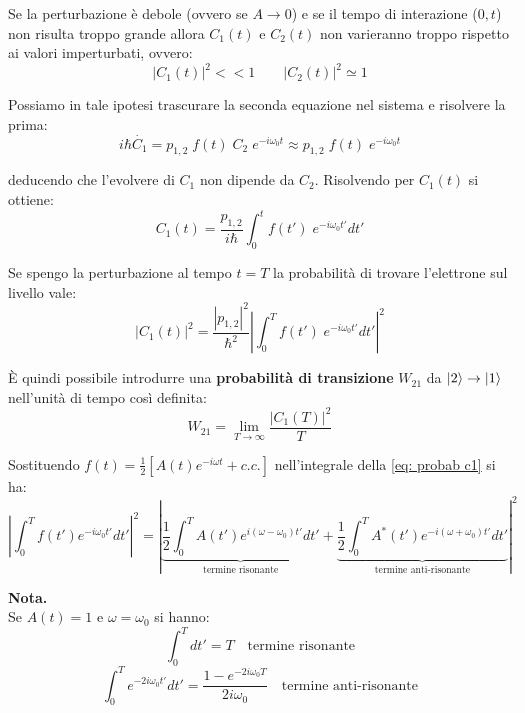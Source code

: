 Se la perturbazione è debole (ovvero se $A \rightarrow 0$) e se il tempo di interazione ($0,t$) non risulta troppo grande allora $C_1(t)$ e $C_2(t)$ non varieranno troppo rispetto ai valori imperturbati, ovvero:
\begin{equation*}
    |C_1(t)|^2 << 1 \qquad |C_2(t)|^2 \simeq 1
\end{equation*}

Possiamo in tale ipotesi trascurare la seconda equazione nel sistema e risolvere la prima:
\begin{equation*}
    i\hbar \dot{C_1} = p_{1,2} \; f(t) \; C_2 \; e^{-i\omega_0 t} \approx p_{1,2} \; f(t) \; e^{-i\omega_0 t}
\end{equation*}

deducendo che l'evolvere di $C_1$ non dipende da $C_2$.
Risolvendo per $C_1(t)$ si ottiene:
\begin{equation*}
    C_1(t) = \frac{p_{1,2}}{i\hbar} \int_0^t f(t') \; e^{-i\omega_0 t'} dt'
\end{equation*}

Se spengo la perturbazione al tempo $t = T$ la probabilità di trovare l'elettrone sul livello  vale:
\begin{equation}\label{eq: probab c1}
    |C_1(t)|^2 = \frac{|p_{1,2}|^2}{\hbar^2} \left|\int_0^T f(t') \; e^{-i\omega_0 t'} dt'\right|^2
\end{equation}

È quindi possibile introdurre una\textbf{ probabilità di transizione} $W_{21}$ da $|2\rangle \rightarrow |1\rangle$ nell'unità di tempo così definita:
\begin{equation*}
    W_{21} = \lim_{T \rightarrow \infty} \frac{|C_1(T)|^2}{T}
\end{equation*}

Sostituendo $f(t) = \frac{1}{2} \left[ A(t) e^{-i\omega t} + c.c.\right]$ nell'integrale della \eqref{eq: probab c1} si ha:
\begin{equation*}
    \left|\int_0^T f(t') e^{-i\omega_0 t'} dt'\right|^2 = \left|\underbrace{\frac{1}{2} \int_0^T A(t') e^{i(\omega - \omega_0) t'} dt'}_\text{termine risonante} + \underbrace{\frac{1}{2} \int_0^T A^*(t') e^{-i(\omega + \omega_0) t'} dt'}_\text{termine anti-risonante} \right|^2
\end{equation*}

\textbf{Nota.}\\
Se $A(t) = 1$ e $\omega = \omega_0$ si hanno:
\begin{equation*}
    \int_0^T  dt' = T \quad \text{termine risonante}
\end{equation*}
\begin{equation*}
    \int_0^T e^{-2i\omega_0 t'} dt' = \frac{1 - e^{-2i\omega_0 T}}{2i \omega_0} \quad \text{termine anti-risonante}
\end{equation*}

